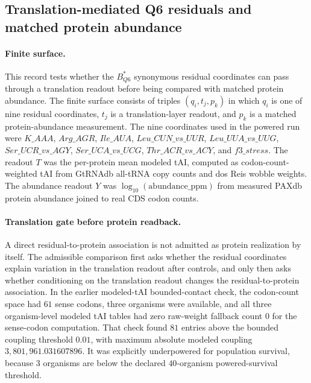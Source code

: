 \subsection{Translation-mediated Q6 residuals and matched protein abundance}\label{sec:q6-translation-mediated-protein-abundance-cross-layer}

\paragraph{Finite surface.}
This record tests whether the $B^{*}_{Q6}$ synonymous residual coordinates can pass through a translation readout before being compared with matched protein abundance. The finite surface consists of triples $(q_i,t_j,p_k)$ in which $q_i$ is one of nine residual coordinates, $t_j$ is a translation-layer readout, and $p_k$ is a matched protein-abundance measurement. The nine coordinates used in the powered run were $K\_AAA$, $Arg\_AGR$, $Ile\_AUA$, $Leu\_CUN\_vs\_UUR$, $Leu\_UUA\_vs\_UUG$, $Ser\_UCR\_vs\_AGY$, $Ser\_UCA\_vs\_UCG$, $Thr\_ACR\_vs\_ACY$, and $f3\_stress$. The readout $T$ was the per-protein mean modeled tAI, computed as codon-count-weighted tAI from GtRNAdb all-tRNA copy counts and dos Reis wobble weights. The abundance readout $Y$ was $\log_{10}(\mathrm{abundance\_ppm})$ from measured PAXdb protein abundance joined to real CDS codon counts.

\paragraph{Translation gate before protein readback.}
A direct residual-to-protein association is not admitted as protein realization by itself. The admissible comparison first asks whether the residual coordinates explain variation in the translation readout after controls, and only then asks whether conditioning on the translation readout changes the residual-to-protein association. In the earlier modeled-tAI bounded-contact check, the codon-count space had $61$ sense codons, three organisms were available, and all three organism-level modeled tAI tables had zero raw-weight fallback count $0$ for the sense-codon computation. That check found $81$ entries above the bounded coupling threshold $0.01$, with maximum absolute modeled coupling $3{,}801{,}961.031607896$. It was explicitly underpowered for population survival, because $3$ organisms are below the declared $40$-organism powered-survival threshold.

